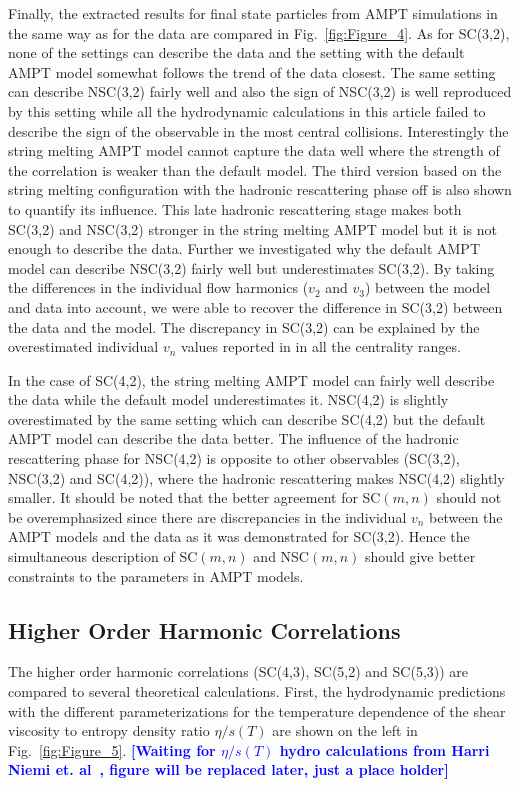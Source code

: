 Finally, the extracted results for final state particles from AMPT simulations in the same way as for the data are compared in Fig.~\ref{fig:Figure_4}.
As for SC(3,2), none of the settings can describe the data and the setting with the default AMPT model somewhat follows the trend of the data closest. The same setting can describe NSC(3,2) fairly well and also the sign of NSC(3,2) is well reproduced by this setting while all the hydrodynamic calculations in this article failed to describe the sign of the observable in the most central collisions.
Interestingly the string melting AMPT model cannot capture the data well where the strength of the correlation is weaker than the default model.
The third version based on the string melting configuration with the hadronic rescattering phase off is also shown to quantify its influence.
This late hadronic rescattering stage makes both SC(3,2) and NSC(3,2) stronger in the string melting AMPT model but it is not enough to describe the data.
Further we investigated why the default AMPT model can describe NSC(3,2) fairly well but underestimates SC(3,2). By taking the differences in the individual flow harmonics ($v_2$ and $v_3$) between the model and data into account, we were able to recover the difference in SC(3,2) between the data and the model. The discrepancy in SC(3,2) can be explained by the overestimated individual $v_n$ values reported in \cite{Adam:2016nfo} in all the centrality ranges. 

In the case of SC(4,2), the string melting AMPT model can fairly well describe the data while the default model underestimates it.
NSC(4,2) is slightly overestimated by the same setting which can describe SC(4,2) but the default AMPT model can describe the data better.
The influence of the hadronic rescattering phase for NSC(4,2) is opposite to other observables (SC(3,2), NSC(3,2) and SC(4,2)), where the hadronic rescattering makes NSC(4,2) slightly smaller.
It should be noted that the better agreement for SC$(m,n)$ should not be overemphasized since there are discrepancies in the individual $v_n$ between the AMPT models and the data as it was demonstrated for SC(3,2).
Hence the simultaneous description of SC$(m,n)$ and NSC$(m,n)$ should give better constraints to the parameters in AMPT models.

\subsection{Higher Order Harmonic Correlations}
The higher order harmonic correlations (SC(4,3), SC(5,2) and SC(5,3)) are compared to several theoretical calculations. 
First, the hydrodynamic predictions with the different parameterizations for the temperature dependence of the shear viscosity to entropy density ratio $\eta/s(T)$ are shown on the left in Fig.~\ref{fig:Figure_5}. 
\noindent\textbf{\textcolor{blue}{[Waiting for $\eta/s(T)$ hydro calculations from Harri Niemi et. al~\cite{Niemi:2015qia}, figure will be replaced later, just a place holder]}}


